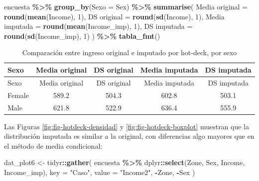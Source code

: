 \documentclass[
  spanish,
  12pt,
]{book}
\newenvironment{Shaded}{\begin{snugshade}}{\end{snugshade}}
\newcommand{\AttributeTok}[1]{\textcolor[rgb]{0.13,0.29,0.53}{#1}}
\newcommand{\DecValTok}[1]{\textcolor[rgb]{0.00,0.00,0.81}{#1}}
\newcommand{\FunctionTok}[1]{\textcolor[rgb]{0.13,0.29,0.53}{\textbf{#1}}}
\newcommand{\NormalTok}[1]{#1}
\newcommand{\OtherTok}[1]{\textcolor[rgb]{0.56,0.35,0.01}{#1}}
\newcommand{\SpecialCharTok}[1]{\textcolor[rgb]{0.81,0.36,0.00}{\textbf{#1}}}
\newcommand{\StringTok}[1]{\textcolor[rgb]{0.31,0.60,0.02}{#1}}
\begin{document}
\begin{Shaded}
\begin{Highlighting}[]
\NormalTok{encuesta }\SpecialCharTok{\%\textgreater{}\%}
  \FunctionTok{group\_by}\NormalTok{(}\AttributeTok{Sexo =}\NormalTok{ Sex) }\SpecialCharTok{\%\textgreater{}\%}
  \FunctionTok{summarise}\NormalTok{(}
    \StringTok{\textasciigrave{}}\AttributeTok{Media original}\StringTok{\textasciigrave{}}  \OtherTok{=} \FunctionTok{round}\NormalTok{(}\FunctionTok{mean}\NormalTok{(Income), }\DecValTok{1}\NormalTok{),}
    \StringTok{\textasciigrave{}}\AttributeTok{DS original}\StringTok{\textasciigrave{}}     \OtherTok{=} \FunctionTok{round}\NormalTok{(}\FunctionTok{sd}\NormalTok{(Income), }\DecValTok{1}\NormalTok{),}
    \StringTok{\textasciigrave{}}\AttributeTok{Media imputada}\StringTok{\textasciigrave{}}  \OtherTok{=} \FunctionTok{round}\NormalTok{(}\FunctionTok{mean}\NormalTok{(Income\_imp), }\DecValTok{1}\NormalTok{),}
    \StringTok{\textasciigrave{}}\AttributeTok{DS imputada}\StringTok{\textasciigrave{}}     \OtherTok{=} \FunctionTok{round}\NormalTok{(}\FunctionTok{sd}\NormalTok{(Income\_imp), }\DecValTok{1}\NormalTok{)}
\NormalTok{  ) }\SpecialCharTok{\%\textgreater{}\%} \FunctionTok{tabla\_fmt}\NormalTok{()}
\end{Highlighting}
\end{Shaded}

\begin{longtable}[]{@{}lcccc@{}}
\caption{\label{tab:tab-sesgo-hotdeck-sexo}Comparación entre ingreso original e imputado por hot-deck, por sexo}\tabularnewline
\toprule\noalign{}
Sexo & Media original & DS original & Media imputada & DS imputada \\
\midrule\noalign{}
\endfirsthead
\toprule\noalign{}
Sexo & Media original & DS original & Media imputada & DS imputada \\
\midrule\noalign{}
\endhead
\bottomrule\noalign{}
\endlastfoot
Female & 589.2 & 504.3 & 602.8 & 503.1 \\
Male & 621.8 & 522.9 & 636.4 & 555.9 \\
\end{longtable}

Las Figuras \ref{fig:fig-hotdeck-densidad} y \ref{fig:fig-hotdeck-boxplot} muestran que la distribución imputada es similar a la original, con diferencias algo mayores que en el método de media condicional:

\begin{Shaded}
\begin{Highlighting}[]
\NormalTok{dat\_plot6 }\OtherTok{\textless{}{-}}\NormalTok{ tidyr}\SpecialCharTok{::}\FunctionTok{gather}\NormalTok{(}
\NormalTok{  encuesta }\SpecialCharTok{\%\textgreater{}\%}\NormalTok{ dplyr}\SpecialCharTok{::}\FunctionTok{select}\NormalTok{(Zone, Sex, Income, Income\_imp),}
  \AttributeTok{key =} \StringTok{"Caso"}\NormalTok{, }\AttributeTok{value =} \StringTok{"Income2"}\NormalTok{, }\SpecialCharTok{{-}}\NormalTok{Zone, }\SpecialCharTok{{-}}\NormalTok{Sex}
\NormalTok{)}
\end{Highlighting}
\end{Shaded}
\end{document}
